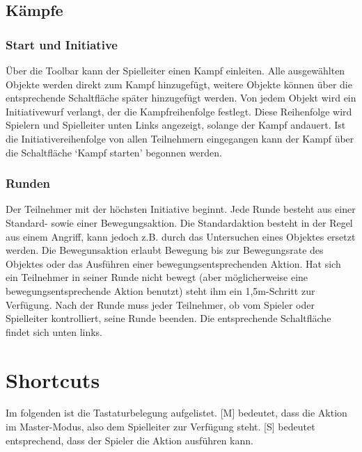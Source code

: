 \documentclass[german,10pt,a4paper,twocolumn,colorscheme=darkblue]{orarticle}
\begin{document}
		\subsection{Kämpfe}
			\subsubsection*{Start und Initiative}
			Über die Toolbar kann der Spielleiter einen Kampf einleiten. Alle ausgewählten Objekte werden direkt zum Kampf hinzugefügt, weitere Objekte können über die entsprechende Schaltfläche später hinzugefügt werden. Von jedem Objekt wird ein Initiativewurf verlangt, der die Kampfreihenfolge festlegt. Diese Reihenfolge wird Spielern und Spielleiter unten Links angezeigt, solange der Kampf andauert. Ist die Initiativereihenfolge von allen Teilnehmern eingegangen kann der Kampf über die Schaltfläche `Kampf starten' begonnen werden.
			\subsubsection*{Runden}
			Der Teilnehmer mit der höchsten Initiative beginnt. Jede Runde besteht aus einer Standard- sowie einer Bewegungsaktion. Die Standardaktion besteht in der Regel aus einem Angriff, kann jedoch z.B. durch das Untersuchen eines Objektes ersetzt werden. Die Bewegunsaktion erlaubt Bewegung bis zur Bewegungsrate des Objektes oder das Ausführen einer bewegungsentsprechenden Aktion. Hat sich ein Teilnehmer in seiner Runde nicht bewegt (aber möglicherweise eine bewegungsentsprechende Aktion benutzt) steht ihm ein 1,5m-Schritt zur Verfügung. Nach der Runde muss jeder Teilnehmer, ob vom Spieler oder Spielleiter kontrolliert, seine Runde beenden. Die entsprechende Schaltfläche findet sich unten links.
			
	\section{Shortcuts}
		Im folgenden ist die Tastaturbelegung aufgelistet. [M] bedeutet, dass die Aktion im Master-Modus, also dem Spielleiter zur Verfügung steht. [S] bedeutet entsprechend, dass der Spieler die Aktion ausführen kann.\\
		
\end{document}
